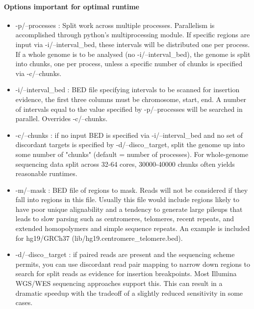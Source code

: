 \documentclass[letterpaper,11pt]{article}
\begin{document}
\paragraph{Options important for optimal runtime}
\begin{itemize}
\item -p/--processes :  Split work across multiple processes. Parallelism is accomplished through python's multiprocessing module. If specific regions are input via -i/--interval\_bed, these intervals will be distributed one per process. If a whole genome is to be analysed (no -i/--interval\_bed), the genome is split into chunks, one per process, unless a specific number of chunks is specified via -c/--chunks.

\item -i/--interval\_bed : BED file specifying intervals to be scanned for insertion evidence, the first three columns must be chromosome, start, end. A number of intervals equal to the value specified by -p/--processes will be searched in parallel. Overrides -c/--chunks.

\item -c/--chunks : if no input BED is specified via -i/--interval\_bed and no set of discordant targets is specified by -d/--disco\_target, split the genome up into some number of "chunks" (default = number of processes). For whole-genome sequencing data split across 32-64 cores, 30000-40000 chunks often yields reasonable runtimes.

\item -m/--mask : BED file of regions to mask. Reads will not be considered if they fall into regions in this file. Usually this file would include regions likely to have poor unique alignability and a tendency to generate large pileups that leads to slow parsing such as centromeres, telomeres, recent repeats, and extended homopolymers and simple sequence repeats. An example is included for hg19/GRCh37 (lib/hg19.centromere\_telomere.bed).

\item -d/--disco\_target : if paired reads are present and the sequencing scheme permits, you can use discordant read pair mapping to narrow down regions to search for split reads as evidence for insertion breakpoints. Most Illumina WGS/WES sequencing approaches support this. This can result in a dramatic speedup with the tradeoff of a slightly reduced sensitivity in some cases. 

\end{itemize}
\end{document}
